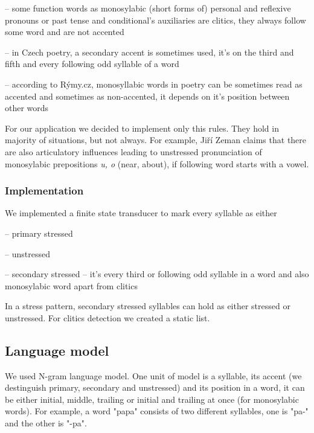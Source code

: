 \documentclass[a4]{article}
\begin{document}

-- some function words as monosylabic (short forms of) personal and
reflexive pronouns or past tense and conditional's auxiliaries are clitics,
they always follow some word and are not accented %

-- in Czech poetry, a secondary accent is sometimes used, it's on the third and
fifth and every following odd syllable of a word

-- according to Rýmy.cz\cite{rymy}, monosyllabic words in poetry can be
sometimes read as accented and sometimes as non-accented, it depends on
it's position between other words

For our application we decided to implement only this rules. They hold in
majority of situations, but not always. For example, Jiří Zeman\cite{zeman} claims that
there are also articulatory influences leading to unstressed
pronunciation of monosylabic prepositions {\sl u, o} (near, about), if
following word starts with a vowel. %

\subsubsection{Implementation}

We implemented a finite state transducer\cite{jurafsky} to mark every syllable as either 

-- primary stressed

-- unstressed

-- secondary stressed -- it's every third or following odd syllable in
a word and also monosylabic word apart from clitics

In a stress pattern, secondary stressed syllables can hold as either
stressed or unstressed.  
For clitics detection we created a static list.


\subsection{Language model}

We used N-gram language model. One unit of model is
a syllable, its accent (we destinguish primary, secondary and unstressed)
and its position in a word, it can be either initial, middle, trailing or
initial and trailing at once (for monosylabic words). For example, a word
"papa" consists of two different syllables, one is "pa-" and the other is
"-pa".
\end{document}
